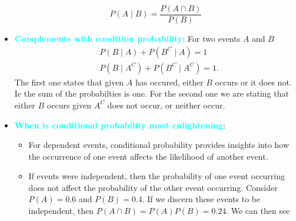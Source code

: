 \documentclass{report}
\begin{document}
\begin{itemize}
            \[
                P(A \mid B) = \frac{P(A \cap B)}{P(B)}
            \]
        \item \textbf{\textcolor{cyan}{Complements with condition probability}}: For two events $A$ and $B$
            \begin{align*}
               &P(B \mid A) + P(B^{C} \mid A) = 1 \\
                &P(B \mid A^{C}) + P(B^{C} \mid A^{C}) = 1
            .\end{align*}
            \bigbreak \noindent 
            The first one states that given $A$ has occured, either $B$ occurs or it does not. Ie the sum of the probabilties is one. For the second one we are stating that either $B$ occurs given $A^{C}$ does not occur, or neither occur.
        \item \textbf{\textcolor{cyan}{When is conditional probability most enlightening}}: 
            \begin{itemize}
                \item For dependent events, conditional probability provides insights into how the occurrence of one event affects the likelihood of another event. 
                \item If events were independent, then the probability of one event occurring does not affect the probability of the other event occurring. Consider $P(A) = 0.6$ and $P(B) = 0.4$. If we discern these events to be independent, then $P(A \cap B) = P(A)P(B) = 0.24$. We can then see

\end{itemize}
\end{itemize}
\end{document}
